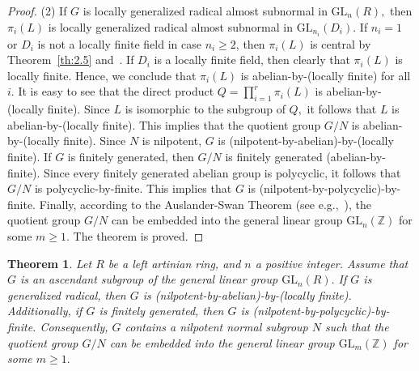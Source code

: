 \documentclass{amsart}
\newtheorem{theorem}{Theorem}[section]
\theoremstyle{definition}
\begin{document}
\begin{proof}
(2) If $G$ is locally generalized radical almost subnormal in $\mathrm{GL}_n(R),$ then $\pi_i(L)$ is locally generalized radical almost subnormal in $\mathrm{GL}_{n_i}(D_i).$ If $n_i=1$ or $D_i$ is not a locally finite field in case $n_i\geq 2$, then $\pi_i(L)$ is central by Theorem~\ref{th:2.5} and~\cite[Theorem 3.3]{Pa_ChuaHai_2026}. If $D_i$ is a locally finite field, then clearly that $\pi_i(L)$ is locally finite. Hence, we conclude that $\pi_i(L)$ is abelian-by-(locally finite) for all $i.$ It is easy to see that the direct product $Q=\prod_{i=1}^{r} \pi_i(L)$ is abelian-by-(locally finite). Since $L$ is isomorphic to the subgroup of $Q,$ it follows that $L$ is abelian-by-(locally finite). This implies that the quotient group $G/N$ is abelian-by-(locally finite). Since $N$ is nilpotent, $G$ is (nilpotent-by-abelian)-by-(locally finite). If $G$ is finitely generated, then $G/N$ is finitely generated (abelian-by-finite). Since every finitely generated abelian group is polycyclic, it follows that $G/N$ is polycyclic-by-finite. This implies that $G$ is (nilpotent-by-polycyclic)-by-finite. Finally, according to the Auslander-Swan Theorem (see e.g.,~\cite[3.3.1]{Bo_Lennox_2004}), the quotient group $G/N$ can be embedded into the general linear group $\mathrm{GL}_n(\mathbb{Z})$ for some $m\geq 1.$ The theorem is proved.
\end{proof}
\begin{theorem}\label{th:5.8} Let $R$ be a left artinian ring, and $n$ a positive integer. Assume that $G$ is an ascendant subgroup of the general linear group $\mathrm{GL}_n(R).$ If $G$ is generalized radical, then $G$ is (nilpotent-by-abelian)-by-(locally finite). Additionally, if $G$ is finitely generated, then $G$ is (nilpotent-by-polycyclic)-by-finite. Consequently, $G$ contains a nilpotent normal subgroup $N$ such that the quotient group $G/N$ can be embedded into the general linear group $\mathrm{GL}_m(\mathbb{Z})$ for some $m\geq 1.$
\end{theorem}
\end{document}
